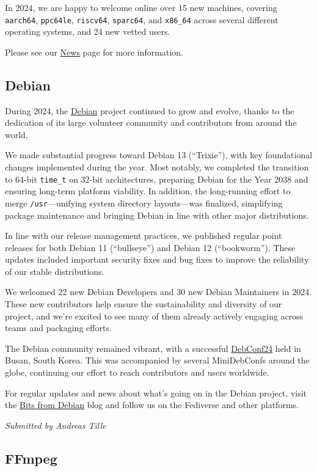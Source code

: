 \documentclass[a4paper]{report}
\begin{document}
In 2024, we are happy to welcome online over 15 new machines, covering {\tt aarch64}, {\tt ppc64le}, {\tt riscv64}, {\tt sparc64}, and {\tt x86\_64} across several different operating systems, and 24 new vetted users.

Please see our \href{https://portal.cfarm.net/news/}{News} page for more information.

\subsection{Debian}

During 2024, the \href{https://www.debian.org/}{Debian} project continued to grow and evolve, thanks to the dedication of its large volunteer community and contributors from around the world.

We made substantial progress toward Debian 13 (``Trixie''), with key foundational changes implemented during the year. Most notably, we completed the transition to 64-bit \texttt{time\_t} on 32-bit architectures, preparing Debian for the Year 2038 and ensuring long-term platform viability. In addition, the long-running effort to merge \texttt{/usr}—unifying system directory layouts—was finalized, simplifying package maintenance and bringing Debian in line with other major distributions.

In line with our release management practices, we published regular point releases for both Debian 11 (``bullseye'') and Debian 12 (``bookworm''). These updates included important security fixes and bug fixes to improve the reliability of our stable distributions.

We welcomed 22 new Debian Developers and 30 new Debian Maintainers in 2024. These new contributors help ensure the sustainability and diversity of our project, and we’re excited to see many of them already actively engaging across teams and packaging efforts.

The Debian community remained vibrant, with a successful \href{https://debconf24.debconf.org/}{DebConf24} held in Busan, South Korea. This was accompanied by several MiniDebConfs around the globe, continuing our effort to reach contributors and users worldwide.

For regular updates and news about what’s going on in the Debian project, visit the \href{https://bits.debian.org/}{Bits from Debian} blog and follow us on the Fediverse and other platforms.

{\em Submitted by Andreas Tille}

\subsection{FFmpeg}
\end{document}
